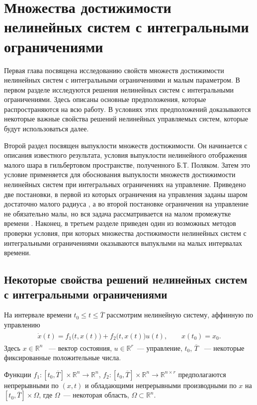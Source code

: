 \documentclass[../main.tex]{subfiles}
\begin{document}
\clearpage
\section{Множества достижимости нелинейных систем с интегральными ограничениями}
Первая глава посвящена исследованию свойств множеств достижимости нелинейных систем с интегральными ограничениями и малым параметром.
В первом разделе исследуются решения нелинейных систем с интегральными ограничениями.
Здесь описаны основные предположения, которые распространяются на всю работу.
В условиях этих предположений доказываются некоторые важные свойства решений нелинейных управляемых систем, которые будут использоваться далее. 
    
Второй раздел посвящен выпуклости множеств достижимости.
Он начинается с описания известного результата, условия выпуклости нелинейного отображения малого шара в гильбертовом пространстве, полученного  Б.Т. Поляком\cite{Polyak2001, Polyak2001ru}.
Затем  это условие применяется для обоснования выпуклости множеств достижимости нелинейных систем при интегральных ограничениях на управление.
Приведено две постановки, в первой из которых ограничения на управления заданы шаром достаточно малого радиуса \cite{Polyak2004}, а во второй постановке ограничения на управление не обязательно малы, но вся задача рассматривается на малом промежутке времени \cite{GusevMotor, GusOsSteklov}.
Наконец, в третьем разделе приведен один из возможных методов проверки условия, при которых множества достижимости нелинейных систем с интегральными ограничениями оказываются выпуклыми на малых интервалах времени. 
     
      
\subsection{Некоторые свойства решений нелинейных систем с интегральными ограничениями}
На интервале времени $ t_0 \leqslant t \leqslant \overline{T} $ рассмотрим нелинейную систему, аффинную по управлению
\begin{gather}\label{s1:common_nonlinear}
\begin{gathered}
    \dot{x}(t)=f_1\big(t,x(t)\big)+f_2\big(t,x(t)\big)u(t), \qquad x(t_0) = x_0.
\end{gathered}
\end{gather}
Здесь $ x \in \mathbb{R}^n $ ~--- вектор состояния, $ u \in \mathbb{R}^r $~--- управление,  $t_0$, $ \overline{T} $ ~--- некоторые фиксированные положительные числа.
    
Функции $ f_1: [t_0, \overline{T}] \times  \mathbb{R}^n \rightarrow \mathbb{R}^{n} $, $ f_2: [t_0, \overline{T}]  \times \mathbb{R}^n \rightarrow \mathbb{R}^{n \times r} $ предполагаются непрерывными по $(x,t)$ и обладающими непрерывными производными по $ x $ на  $ [t_0, \overline{T}] \times \Omega $, где $\Omega$~--- некоторая область, $\Omega \subset \mathbb{R}^n$.  
\end{document}
